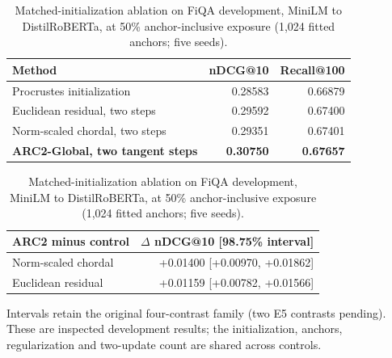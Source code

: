 \begin{table}[t]
\centering
\caption{Matched-initialization ablation on FiQA development, MiniLM to DistilRoBERTa, at 50\% anchor-inclusive exposure (1,024 fitted anchors; five seeds).}
\label{tab:tc1l-matched}
\begin{tabular}{lrr}
\toprule
Method & nDCG@10 & Recall@100 \\
\midrule
Procrustes initialization & 0.28583 & 0.66879 \\
Euclidean residual, two steps & 0.29592 & 0.67400 \\
Norm-scaled chordal, two steps & 0.29351 & 0.67401 \\
\textbf{ARC2-Global, two tangent steps} & \textbf{0.30750} & \textbf{0.67657} \\
\bottomrule
\end{tabular}
\par\smallskip
\begin{tabular}{lr}
\toprule
ARC2 minus control & $\Delta$ nDCG@10 [98.75\% interval] \\
\midrule
Norm-scaled chordal & +0.01400 [+0.00970, +0.01862] \\
Euclidean residual & +0.01159 [+0.00782, +0.01566] \\
\bottomrule
\end{tabular}
\par\smallskip
\begin{minipage}{0.96\linewidth}\small
Intervals retain the original four-contrast family (two E5 contrasts pending). These are inspected development results; the initialization, anchors, regularization and two-update count are shared across controls.
\end{minipage}
\end{table}
